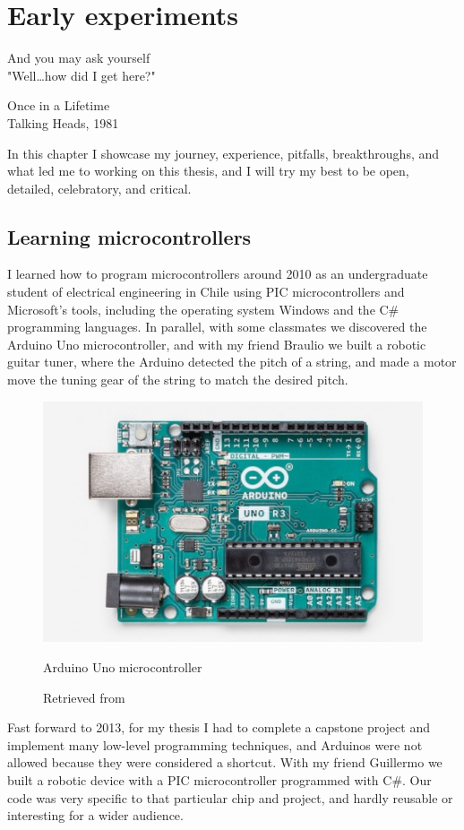 \chapter{Early experiments}

\epigraph{And you may ask yourself \\ "Well\dots how did I get here?"}{Once in a Lifetime \\ Talking Heads, 1981}

In this chapter I showcase my journey, experience, pitfalls, breakthroughs, and what led me to working on this thesis, and I will try my best to be open, detailed, celebratory, and critical.

\section{Learning microcontrollers}

I learned how to program microcontrollers around 2010 as an undergraduate student of electrical engineering in Chile using PIC microcontrollers and Microsoft's tools, including the operating system Windows and the C\# programming languages. In parallel, with some classmates we discovered the Arduino Uno microcontroller, and with my friend Braulio we built a robotic guitar tuner, where the Arduino detected the pitch of a string, and made a motor move the tuning gear of the string to match the desired pitch.

\begin{figure}[ht]
  \centering
  \includegraphics[width=0.75\linewidth,height=0.25\textheight,keepaspectratio]{images/arduino-uno.jpg}
  \caption{Arduino Uno microcontroller}
  \caption*{Retrieved from \cite{website-arduino-uno}}
  \label{fig:arduino-uno}
\end{figure}

Fast forward to 2013, for my thesis I had to complete a capstone project and implement many low-level programming techniques, and Arduinos were not allowed because they were considered a shortcut. With my friend Guillermo we built a robotic device with a PIC microcontroller programmed with C\#. Our code was very specific to that particular chip and project, and hardly reusable or interesting for a wider audience.

